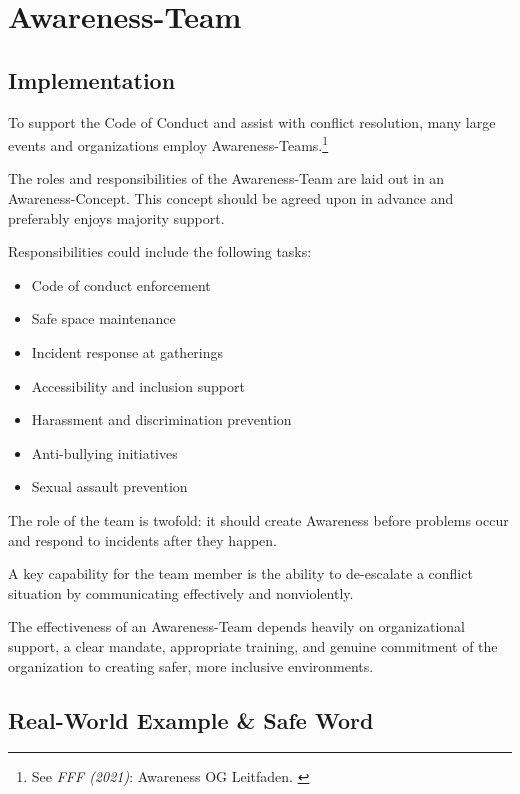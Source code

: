 %
%

\pagebreak
\section{Awareness-Team}

\onehalfspacing

\subsection{Implementation}

To support the Code of Conduct and assist with conflict resolution, many large events and organizations employ Awareness-Teams.\footnote{See \textit{FFF (2021)}: Awareness OG Leitfaden. \cite{fffAware}}

The roles and responsibilities of the Awareness-Team are laid out in an Awareness-Concept. This concept should be agreed upon in advance and preferably enjoys majority support.

Responsibilities could include the following tasks:

\begin{itemize}
    \item Code of conduct enforcement
    \item Safe space maintenance
    \item Incident response at gatherings
    \item Accessibility and inclusion support
    \item Harassment and discrimination prevention
    \item Anti-bullying initiatives
    \item Sexual assault prevention
\end{itemize}

The role of the team is twofold: it should create Awareness before problems occur and respond to incidents after they happen.

A key capability for the team member is the ability to de-escalate a conflict situation by communicating effectively and nonviolently.

The effectiveness of an Awareness-Team depends heavily on organizational support, a clear mandate, appropriate training, and genuine commitment of the organization to creating safer, more inclusive environments.

\subsection{Real-World Example \& Safe Word}


